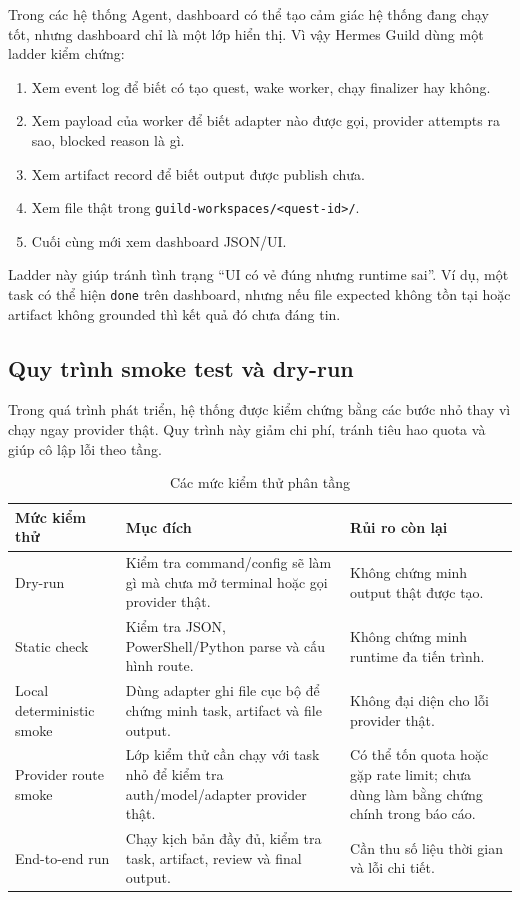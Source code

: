 \documentclass[12pt,a4paper]{article}
\begin{document}
Trong các hệ thống Agent, dashboard có thể tạo cảm giác hệ thống đang chạy tốt, nhưng dashboard chỉ là một lớp hiển thị. Vì vậy Hermes Guild dùng một ladder kiểm chứng:

\begin{enumerate}
    \item Xem event log để biết có tạo quest, wake worker, chạy finalizer hay không.
    \item Xem payload của worker để biết adapter nào được gọi, provider attempts ra sao, blocked reason là gì.
    \item Xem artifact record để biết output được publish chưa.
    \item Xem file thật trong \texttt{guild-workspaces/<quest-id>/}.
    \item Cuối cùng mới xem dashboard JSON/UI.
\end{enumerate}

Ladder này giúp tránh tình trạng ``UI có vẻ đúng nhưng runtime sai''. Ví dụ, một task có thể hiện \texttt{done} trên dashboard, nhưng nếu file expected không tồn tại hoặc artifact không grounded thì kết quả đó chưa đáng tin.

\subsection{Quy trình smoke test và dry-run}

Trong quá trình phát triển, hệ thống được kiểm chứng bằng các bước nhỏ thay vì chạy ngay provider thật. Quy trình này giảm chi phí, tránh tiêu hao quota và giúp cô lập lỗi theo tầng.

\begin{table}[H]
\centering
\caption{Các mức kiểm thử phân tầng}
\begin{tabular}{p{}p{}p{}}
\toprule
\textbf{Mức kiểm thử} & \textbf{Mục đích} & \textbf{Rủi ro còn lại} \\
\midrule
Dry-run & Kiểm tra command/config sẽ làm gì mà chưa mở terminal hoặc gọi provider thật. & Không chứng minh output thật được tạo. \\
Static check & Kiểm tra JSON, PowerShell/Python parse và cấu hình route. & Không chứng minh runtime đa tiến trình. \\
Local deterministic smoke & Dùng adapter ghi file cục bộ để chứng minh task, artifact và file output. & Không đại diện cho lỗi provider thật. \\
Provider route smoke & Lớp kiểm thử cần chạy với task nhỏ để kiểm tra auth/model/adapter provider thật. & Có thể tốn quota hoặc gặp rate limit; chưa dùng làm bằng chứng chính trong báo cáo. \\
End-to-end run & Chạy kịch bản đầy đủ, kiểm tra task, artifact, review và final output. & Cần thu số liệu thời gian và lỗi chi tiết. \\
\bottomrule
\end{tabular}
\end{table}
\end{document}
